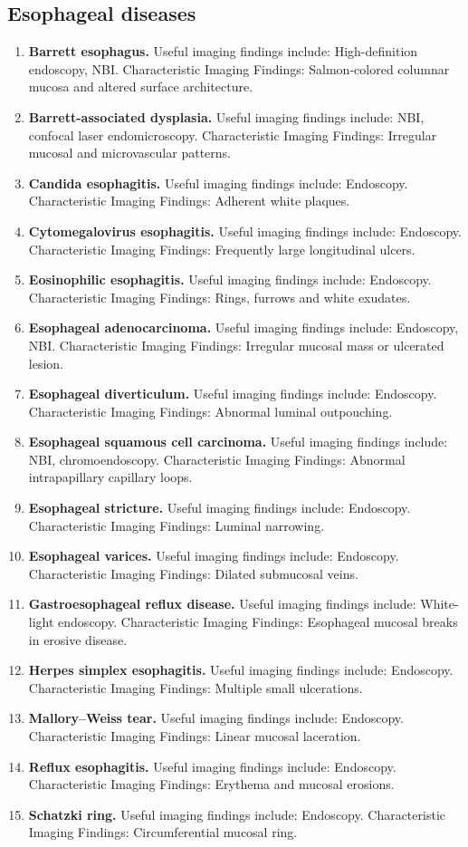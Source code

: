 \subsection{Esophageal diseases}
\begin{enumerate}[leftmargin=*,itemsep=0.45em,topsep=0.4em]
\item \textbf{Barrett esophagus.} Useful imaging findings include: High-definition endoscopy, NBI. Characteristic Imaging Findings: Salmon-colored columnar mucosa and altered surface architecture.
\item \textbf{Barrett-associated dysplasia.} Useful imaging findings include: NBI, confocal laser endomicroscopy. Characteristic Imaging Findings: Irregular mucosal and microvascular patterns.
\item \textbf{Candida esophagitis.} Useful imaging findings include: Endoscopy. Characteristic Imaging Findings: Adherent white plaques.
\item \textbf{Cytomegalovirus esophagitis.} Useful imaging findings include: Endoscopy. Characteristic Imaging Findings: Frequently large longitudinal ulcers.
\item \textbf{Eosinophilic esophagitis.} Useful imaging findings include: Endoscopy. Characteristic Imaging Findings: Rings, furrows and white exudates.
\item \textbf{Esophageal adenocarcinoma.} Useful imaging findings include: Endoscopy, NBI. Characteristic Imaging Findings: Irregular mucosal mass or ulcerated lesion.
\item \textbf{Esophageal diverticulum.} Useful imaging findings include: Endoscopy. Characteristic Imaging Findings: Abnormal luminal outpouching.
\item \textbf{Esophageal squamous cell carcinoma.} Useful imaging findings include: NBI, chromoendoscopy. Characteristic Imaging Findings: Abnormal intrapapillary capillary loops.
\item \textbf{Esophageal stricture.} Useful imaging findings include: Endoscopy. Characteristic Imaging Findings: Luminal narrowing.
\item \textbf{Esophageal varices.} Useful imaging findings include: Endoscopy. Characteristic Imaging Findings: Dilated submucosal veins.
\item \textbf{Gastroesophageal reflux disease.} Useful imaging findings include: White-light endoscopy. Characteristic Imaging Findings: Esophageal mucosal breaks in erosive disease.
\item \textbf{Herpes simplex esophagitis.} Useful imaging findings include: Endoscopy. Characteristic Imaging Findings: Multiple small ulcerations.
\item \textbf{Mallory--Weiss tear.} Useful imaging findings include: Endoscopy. Characteristic Imaging Findings: Linear mucosal laceration.
\item \textbf{Reflux esophagitis.} Useful imaging findings include: Endoscopy. Characteristic Imaging Findings: Erythema and mucosal erosions.
\item \textbf{Schatzki ring.} Useful imaging findings include: Endoscopy. Characteristic Imaging Findings: Circumferential mucosal ring.
\end{enumerate}

